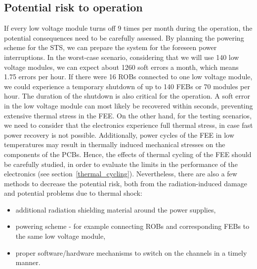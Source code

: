 \subsection{Potential risk to operation}
If every low voltage module turns off 9 times per month during the operation, the potential consequences need to be carefully assessed. By planning the powering scheme for the STS, we can prepare the system for the foreseen power interruptions. In the worst-case scenario, considering that we will use 140 low voltage modules, we can expect about 1260 soft errors a month, which means 1.75 errors per hour.  If there were 16 ROBs connected to one low voltage module, we could experience a temporary shutdown of up to 140 FEBs or 70 modules per hour.  The duration of the shutdown is also critical for the operation. A soft error in the low voltage module can most likely be recovered within seconds, preventing extensive thermal stress in the FEE. On the other hand, for the testing scenarios, we need to consider that the electronics experience full thermal stress, in case fast power recovery is not possible. Additionally, power cycles of the FEE in low temperatures may result in thermally induced mechanical stresses on the components of the PCBs. Hence, the effects of thermal cycling of the FEE should be carefully studied, in order to evaluate the limits in the performance of the electronics  (see section~\ref{thermal_cycling}). Nevertheless, there are also a few methods to decrease the potential risk, both from the radiation-induced damage and potential problems due to thermal shock:
\begin{itemize}
    \item additional radiation shielding material around the power supplies,
    \item powering scheme - for example connecting ROBs and corresponding FEBs to the same low voltage module,
    \item proper software/hardware mechanisms to switch on the channels in a timely manner.
\end{itemize}

